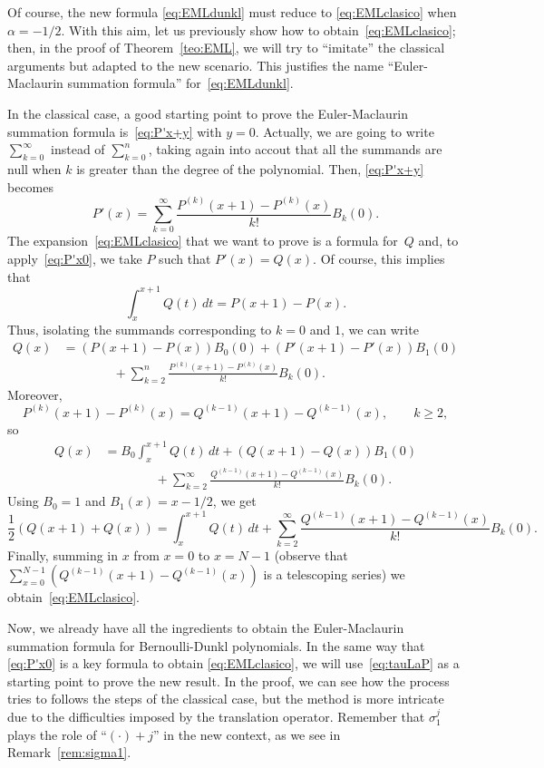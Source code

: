 \documentclass[10pt]{article}
\theoremstyle{plain}
\theoremstyle{definition}
\numberwithin{equation}{section} %
\begin{document}
Of course, the new formula \eqref{eq:EMLdunkl} must reduce to \eqref{eq:EMLclasico} when $\alpha=-1/2$. With this aim,
let us previously show how to obtain~\eqref{eq:EMLclasico}; then, in the proof of Theorem~\ref{teo:EML}, we will try to ``imitate'' the classical arguments but adapted to the new scenario. This justifies the name ``Euler-Maclaurin summation formula'' for~\eqref{eq:EMLdunkl}.

In the classical case, a good starting point to prove the Euler-Maclaurin summation formula is~\eqref{eq:P'x+y} with $y=0$.
Actually, we are going to write $\sum_{k=0}^\infty$ instead of $\sum_{k=0}^n$, taking again into accout that
all the summands are null when $k$ is greater than the degree of the polynomial. Then, \eqref{eq:P'x+y} becomes
\begin{equation}
\label{eq:P'x0}
  P'(x) = \sum_{k=0}^{\infty} \frac{P^{(k)}(x+1) - P^{(k)}(x)}{k!} B_k(0).
\end{equation}
The expansion~\eqref{eq:EMLclasico} that we want to prove is a formula for~$Q$ and, to apply~\eqref{eq:P'x0}, we take $P$ such that $P'(x)=Q(x)$. Of course, this implies that
\[
  \int_x^{x+1} Q(t)\,dt = P(x+1)-P(x).
\]
Thus, isolating the summands corresponding to $k=0$ and $1$, we can write
\begin{align*}
  Q(x) &= (P(x+1)-P(x))B_0(0) + (P'(x+1)-P'(x))B_1(0) \\
  &\qquad\qquad+ \sum_{k=2}^n \frac{P^{(k)}(x+1) - P^{(k)}(x)}{k!} B_k(0).
\end{align*}
Moreover,
\[
  P^{(k)}(x+1) - P^{(k)}(x) = Q^{(k-1)}(x+1) - Q^{(k-1)}(x), \qquad k \ge 2,
\]
so 
\begin{align*}
  Q(x) &= B_0 \int_{x}^{x+1} Q(t)\,dt + (Q(x+1)-Q(x))B_1(0) \\
  &\qquad\qquad+ \sum_{k=2}^{\infty} \frac{Q^{(k-1)}(x+1) - Q^{(k-1)}(x)}{k!} B_k(0).
\end{align*}
Using $B_0=1$ and $B_1(x) = x-1/2$, we get
\begin{equation}
\label{eq:Qx+1x}
  \frac{1}{2}(Q(x+1)+Q(x)) 
  = \int_{x}^{x+1} Q(t)\,dt + \sum_{k=2}^{\infty} \frac{Q^{(k-1)}(x+1) - Q^{(k-1)}(x)}{k!} B_k(0).
\end{equation}
Finally, summing in $x$ from $x=0$ to $x=N-1$ (observe that $\sum_{x=0}^{N-1} (Q^{(k-1)}(x+1) - Q^{(k-1)}(x))$ is a telescoping series) we obtain~\eqref{eq:EMLclasico}.

Now, we already have all the ingredients to obtain the Euler-Maclaurin summation formula for Bernoulli-Dunkl polynomials.
In the same way that \eqref{eq:P'x0} is a key formula to obtain \eqref{eq:EMLclasico}, we will use~\eqref{eq:tauLaP} as a starting point to prove the new result. In the proof, we can see how the process tries to follows the steps of the classical case, but the method is more intricate due to the difficulties imposed by the translation operator. Remember that $\sigma_1^{j}$ plays the role of ``$(\cdot)+j$'' in the new context, as we see in Remark~\ref{rem:sigma1}.
\end{document}
